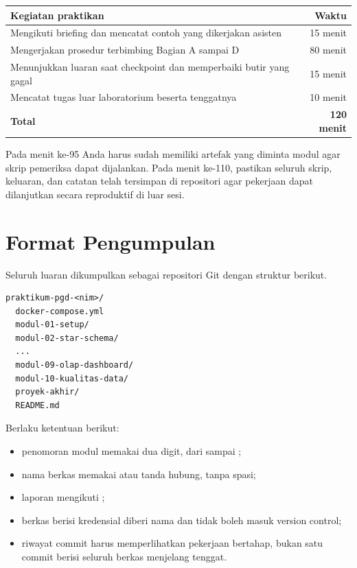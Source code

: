 \begin{center}
\small
\begin{tabular}{@{}p{}r@{}}
\toprule
\textbf{Kegiatan praktikan} & \textbf{Waktu} \\
\midrule
Mengikuti briefing dan mencatat contoh yang dikerjakan asisten & 15 menit \\
Mengerjakan prosedur terbimbing Bagian A sampai D & 80 menit \\
Menunjukkan luaran saat checkpoint dan memperbaiki butir yang gagal & 15 menit \\
Mencatat tugas luar laboratorium beserta tenggatnya & 10 menit \\
\midrule
\textbf{Total} & \textbf{120 menit} \\
\bottomrule
\end{tabular}
\end{center}

Pada menit ke-95 Anda harus sudah memiliki artefak yang diminta modul agar
skrip pemeriksa dapat dijalankan. Pada menit ke-110, pastikan seluruh skrip,
keluaran, dan catatan telah tersimpan di repositori agar pekerjaan dapat
dilanjutkan secara reproduktif di luar sesi.

\section{Format Pengumpulan}

Seluruh luaran dikumpulkan sebagai repositori Git dengan struktur berikut.

\begin{lstlisting}[style=shellgaya]
praktikum-pgd-<nim>/
  docker-compose.yml
  modul-01-setup/
  modul-02-star-schema/
  ...
  modul-09-olap-dashboard/
  modul-10-kualitas-data/
  proyek-akhir/
  README.md
\end{lstlisting}

Berlaku ketentuan berikut:

\begin{itemize}
  \item penomoran modul memakai dua digit, dari  sampai
        ;
  \item nama berkas memakai  atau tanda hubung, tanpa
        spasi;
  \item laporan mengikuti ;
  \item berkas berisi kredensial diberi nama  dan tidak boleh
        masuk version control;
  \item riwayat commit harus memperlihatkan pekerjaan bertahap, bukan satu
        commit berisi seluruh berkas menjelang tenggat.
\end{itemize}

